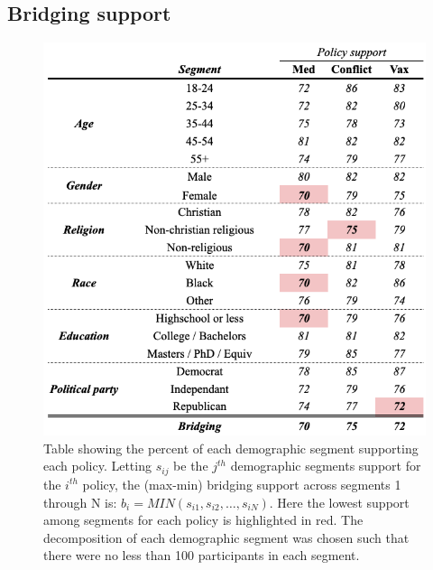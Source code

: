 \documentclass{article}
\begin{document}
\subsection{Bridging support}\label{A:bridging support}
\begin{figure}[H]
\centering
  \includegraphics[width=0.7\linewidth]{figs/bridging_table.png}
  \caption{Table showing the percent of each demographic segment supporting each policy. Letting  $s_{ij}$ be the $j^{th}$ demographic segments support for the $i^{th}$ policy, the (max-min) bridging support across segments 1 through N is: $ b_i = MIN(s_{i1}, s_{i2}, … , s_{iN}) $. Here the lowest support among segments for each policy is highlighted in red. The decomposition of each demographic segment was chosen such that there were no less than 100 participants in each segment.}
  \label{fig:bridging table}
\end{figure}
\end{document}
